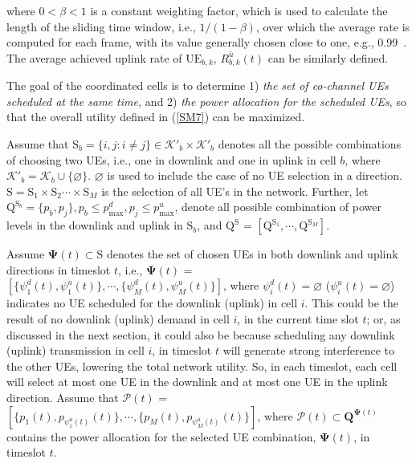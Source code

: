 \documentclass[journal]{IEEEtran}
\begin{document}
where $0<\beta<1$ is a constant weighting factor, which is used to calculate the length of the sliding time window, i.e., $1/(1-\beta)$, over which the average rate is computed for each frame, with its value generally chosen close to one, e.g., 0.99~\cite{Stoylar05, jalali2000data}. The average achieved uplink rate of $\mathrm{UE}_{b,k}$, $\overline{R^u_{b,k}}(t)$ can be similarly defined.

The goal of the coordinated cells is to determine 1) \textit{the set of co-channel UEs scheduled at the same time,} and 2) \textit{the power allocation for the scheduled UEs}, so that the overall utility defined in (\ref{SM7}) can be maximized. 

Assume that ${\mathrm{S}}_b = \{i,j: i \neq j \} \in \mathcal{K}'_b \times \mathcal{K}'_b$ denotes all the possible combinations of choosing two UEs, i.e., one in downlink and one in uplink in cell $b$, where $\mathcal{K}'_b =  \mathcal{K}_b\cup\{\varnothing\}$. $\varnothing$ is used to include the case of no UE selection in a direction. $\boldsymbol{\mathrm{S}} = {\mathrm{S}_1} \times {\mathrm{S}_2} \cdots \times {\mathrm{S}_M}$ is the selection of all UE's in the network. Further, let ${\mathrm{Q}}^{\mathrm{S}_b} = \{p_b,p_j\}, p_b \leq p_{\mathrm{max}}^{d}, p_j \leq p_{\mathrm{max}}^{u}$, denote all possible combination of power levels in the downlink and uplink in ${\mathrm{S}}_b$, and $\boldsymbol{\mathrm{Q}}^{\boldsymbol{\mathrm{S}}}$ =  $[{\mathrm{Q}}^{\mathrm{S}_1},\cdots, {\mathrm{Q}}^{\mathrm{S}_M}] $.

Assume $\boldsymbol{\Psi}(t) \subset \boldsymbol{\mathrm{S}}$ denotes the set of chosen UEs in both downlink and uplink directions in timeslot $t$, i.e., $\boldsymbol{\Psi}(t)$ = $[\{\psi_1^d(t),\psi_1^u(t)\},\cdots,\allowbreak \{\psi_M^d(t),\psi_M^u(t)\} ]$, where $\psi_i^d(t) =\varnothing$ ($\psi_i^u(t) = \varnothing$) indicates no UE scheduled for the downlink (uplink) in cell $i$. This could be the result of no downlink (uplink) demand in cell $i$, in the current time slot $t$; or, as discussed in the next section, it could also be because scheduling any downlink (uplink) transmission in cell $i$, in timeslot $t$ will generate strong interference to the other UEs, lowering the total network utility. So, in each timeslot, each cell will select at most one UE in the downlink and at most one UE in the uplink direction. Assume that $\boldsymbol{\mathcal{P}}(t)$ = $[ \{p_1(t),p_{\psi_1^u(t)}(t)\},\cdots,\{p_M(t),p_{\psi_M^u(t)}(t)\} ]$, where $\boldsymbol{\mathcal{P}}(t) \subset \boldsymbol{\text{Q}}^{\boldsymbol{\Psi}(t)}$ contains the power allocation for the selected UE combination, $\boldsymbol{\Psi}(t)$, in timeslot $t$. 
\end{document}
